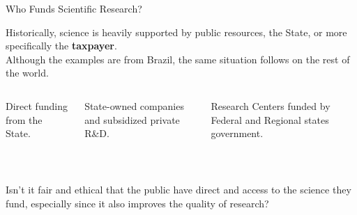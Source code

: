 \documentclass[aspectratio=169]{beamer}
\begin{document}
\begin{frame}{Who Funds Scientific Research?}
  \vspace{.5em}
  
  Historically, science is heavily supported by public resources, the State, or more specifically the \textbf{taxpayer}.\\
  Although the examples are from Brazil, the same situation follows on the rest of the world. 

  \vspace{1em}
  \begin{columns}[T,onlytextwidth]
      \begin{cookiecard}[title=Public Agencies]
        Direct funding from the State.
        \vspace{.5em}
        
         \\
      \end{cookiecard}

      \begin{cookiecard}[title=State \& Subsidies]
        State-owned companies and subsidized private R\&D.
        \vspace{.2em}
        
        \\
         
        
      \end{cookiecard}

      \begin{cookiecard}[title=Public Universities]
        Research Centers funded by Federal and Regional states government.
        \vspace{.5em}
        
           \\
          
      \end{cookiecard}
  \end{columns}
\end{frame}

\begin{frame}[standout]
  Isn't it fair and ethical that the public have direct and access to the science they fund, especially since it also improves the quality of research?
\end{frame}
\end{document}
